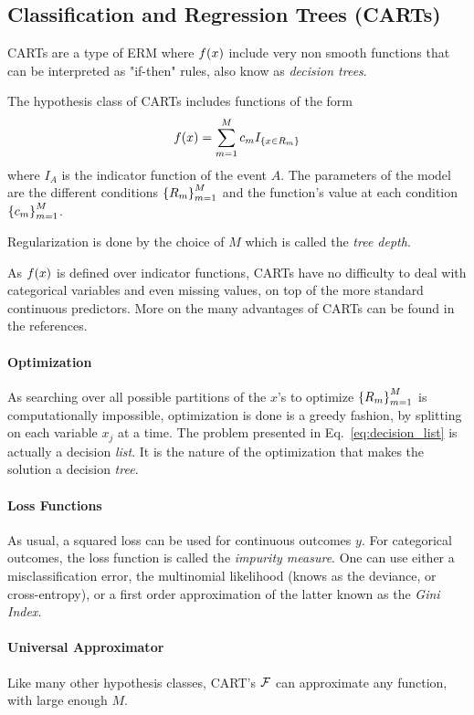 \subsection{Classification and Regression Trees (CARTs)}
CARTs are a type of ERM where $f(x)$ include very non smooth functions that can be interpreted as "if-then" rules, also know as \emph{decision trees}.

The hypothesis class of CARTs includes functions of the form
\begin{align}
\label{eq:decision_list}
	f(x)=\sum_{m=1}^M c_m I_{\left\{ x \in R_m \right\}}
\end{align}
where $I_A$ is the indicator function of the event $A$.
The parameters of the model are the different conditions $\left\{ R_m \right\}_{m=1}^M$ and the function's value at each condition $\left\{ c_m \right\}_{m=1}^M$. 

Regularization is done by the choice of $M$ which is called the \emph{tree depth}.

As $f(x)$ is defined over indicator functions, CARTs have no difficulty to deal with categorical variables and even missing values, on top of the more standard continuous predictors. More on the many advantages of CARTs can be found in the references.

\paragraph{Optimization}
As searching over all possible partitions of the $x$'s to optimize $\left\{ R_m \right\}_{m=1}^M$ is computationally impossible, optimization is done is a greedy fashion, by splitting on each variable $x_j$ at a time.
The problem presented in Eq.~\ref{eq:decision_list} is actually a decision \emph{list}. It is the nature of the optimization that makes the solution a decision \emph{tree}.


\paragraph{Loss Functions}
As usual, a squared loss can be used for continuous outcomes $y$.
For categorical outcomes, the loss function is called the \emph{impurity measure}.
One can use either a misclassification error, the multinomial likelihood (knows as the deviance, or cross-entropy), or a first order approximation of the latter known as the \emph{Gini Index}.


\paragraph{Universal Approximator}
Like many other hypothesis classes, CART's $\mathcal{F}$ can approximate any function, with large enough $M$.


